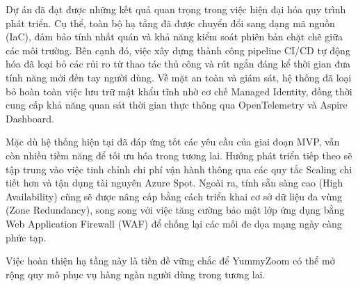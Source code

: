 \documentclass[a4paper,12pt,twoside]{report}
\begin{document}
Dự án đã đạt được những kết quả quan trọng trong việc hiện đại hóa quy trình phát triển. Cụ thể, toàn bộ hạ tầng đã được chuyển đổi sang dạng mã nguồn (IaC), đảm bảo tính nhất quán và khả năng kiểm soát phiên bản chặt chẽ giữa các môi trường. Bên cạnh đó, việc xây dựng thành công pipeline CI/CD tự động hóa đã loại bỏ các rủi ro từ thao tác thủ công và rút ngắn đáng kể thời gian đưa tính năng mới đến tay người dùng. Về mặt an toàn và giám sát, hệ thống đã loại bỏ hoàn toàn việc lưu trữ mật khẩu tĩnh nhờ cơ chế Managed Identity, đồng thời cung cấp khả năng quan sát thời gian thực thông qua OpenTelemetry và Aspire Dashboard.

Mặc dù hệ thống hiện tại đã đáp ứng tốt các yêu cầu của giai đoạn MVP, vẫn còn nhiều tiềm năng để tối ưu hóa trong tương lai. Hướng phát triển tiếp theo sẽ tập trung vào việc tinh chỉnh chi phí vận hành thông qua các quy tắc Scaling chi tiết hơn và tận dụng tài nguyên Azure Spot. Ngoài ra, tính sẵn sàng cao (High Availability) cũng sẽ được nâng cấp bằng cách triển khai cơ sở dữ liệu đa vùng (Zone Redundancy), song song với việc tăng cường bảo mật lớp ứng dụng bằng Web Application Firewall (WAF) để chống lại các mối đe dọa mạng ngày càng phức tạp.

Việc hoàn thiện hạ tầng này là tiền đề vững chắc để YummyZoom có thể mở rộng quy mô phục vụ hàng ngàn người dùng trong tương lai.
\end{document}
